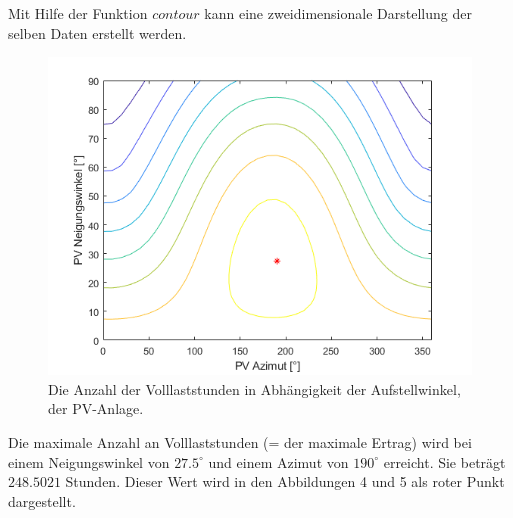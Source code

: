 \documentclass[a4paper,12pt]{article}
\begin{document}
	Mit Hilfe der Funktion $contour$ kann eine zweidimensionale Darstellung der selben Daten erstellt werden.
	\begin{figure}[H]
		\centering
		\includegraphics[width=12cm]{img/results/VolllaststundenAbhaengigVomWinkelContour}
		\caption{Die Anzahl der Volllaststunden in Abhängigkeit der Aufstellwinkel, der PV-Anlage.}
	\end{figure}
	Die maximale Anzahl an Volllaststunden (= der maximale Ertrag) wird bei einem Neigungswinkel von $27.5^{\circ}$ und einem Azimut von $190^{\circ}$ erreicht. Sie beträgt $248.5021$ Stunden. Dieser Wert wird in den Abbildungen 4 und 5 als roter Punkt dargestellt.
\end{document}
